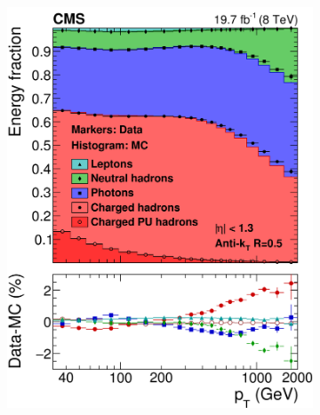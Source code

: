 \begin{figure}[]
    \begin{subfigure}{0.5\linewidth}
    \centering
    \includegraphics[width=0.95\linewidth]{Chapitre4/Images/PFJetPT.png} 
    \caption*{} 
    \end{subfigure}
    \begin{subfigure}{0.5\linewidth}
    \centering

\end{subfigure}
\end{figure}
